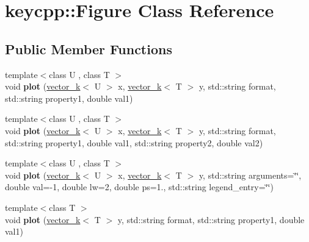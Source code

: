 \hypertarget{classkeycpp_1_1_figure}{\section{keycpp\-:\-:Figure Class Reference}
\label{classkeycpp_1_1_figure}
}
\subsection*{Public Member Functions}
\begin{DoxyCompactItemize}
\item 
\hypertarget{classkeycpp_1_1_figure_a5e3cff38d4f1df2543d221c741a515eb}{{\footnotesize template$<$class U , class T $>$ }\\void {\bfseries plot} (\hyperlink{classkeycpp_1_1vector__k}{vector\-\_\-k}$<$ U $>$ x, \hyperlink{classkeycpp_1_1vector__k}{vector\-\_\-k}$<$ T $>$ y, std\-::string format, std\-::string property1, double val1)}\label{classkeycpp_1_1_figure_a5e3cff38d4f1df2543d221c741a515eb}

\item 
\hypertarget{classkeycpp_1_1_figure_a38b649480d000a9c67541d3b310a920f}{{\footnotesize template$<$class U , class T $>$ }\\void {\bfseries plot} (\hyperlink{classkeycpp_1_1vector__k}{vector\-\_\-k}$<$ U $>$ x, \hyperlink{classkeycpp_1_1vector__k}{vector\-\_\-k}$<$ T $>$ y, std\-::string format, std\-::string property1, double val1, std\-::string property2, double val2)}\label{classkeycpp_1_1_figure_a38b649480d000a9c67541d3b310a920f}

\item 
\hypertarget{classkeycpp_1_1_figure_a6c228be127b88c455a11bc6ec6604290}{{\footnotesize template$<$class U , class T $>$ }\\void {\bfseries plot} (\hyperlink{classkeycpp_1_1vector__k}{vector\-\_\-k}$<$ U $>$ x, \hyperlink{classkeycpp_1_1vector__k}{vector\-\_\-k}$<$ T $>$ y, std\-::string arguments=\char`\"{}\char`\"{}, double val=-\/1, double lw=2, double ps=1., std\-::string legend\-\_\-entry=\char`\"{}\char`\"{})}\label{classkeycpp_1_1_figure_a6c228be127b88c455a11bc6ec6604290}

\item 
\hypertarget{classkeycpp_1_1_figure_a9039b7eee3ef0fae5c7aca397837f629}{{\footnotesize template$<$class T $>$ }\\void {\bfseries plot} (\hyperlink{classkeycpp_1_1vector__k}{vector\-\_\-k}$<$ T $>$ y, std\-::string format, std\-::string property1, double val1)}\label{classkeycpp_1_1_figure_a9039b7eee3ef0fae5c7aca397837f629}


\end{DoxyCompactItemize}
